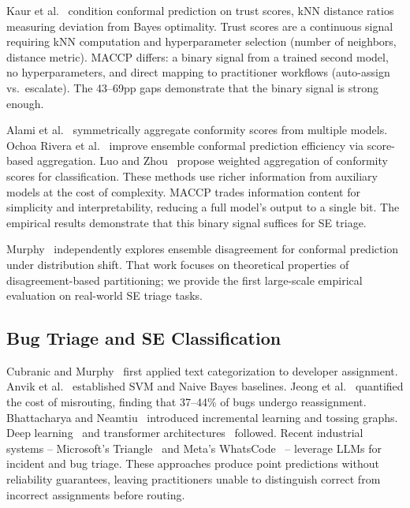 \documentclass[conference]{IEEEtran}
\newcommand{\pp}{\text{pp}}
\begin{document}
Kaur et al.~\cite{kaur2025trust} condition conformal prediction on trust scores, kNN distance ratios measuring deviation from Bayes optimality. Trust scores are a continuous signal requiring kNN computation and hyperparameter selection (number of neighbors, distance metric). MACCP differs: a binary signal from a trained second model, no hyperparameters, and direct mapping to practitioner workflows (auto-assign vs.\ escalate). The 43--69$\pp$ gaps demonstrate that the binary signal is strong enough.

Alami et al.~\cite{alami2025sacp} symmetrically aggregate conformity scores from multiple models. Ochoa Rivera et al.~\cite{ochoarivera2025csa} improve ensemble conformal prediction efficiency via score-based aggregation. Luo and Zhou~\cite{luo2025optimal} propose weighted aggregation of conformity scores for classification. These methods use richer information from auxiliary models at the cost of complexity. MACCP trades information content for simplicity and interpretability, reducing a full model's output to a single bit. The empirical results demonstrate that this binary signal suffices for SE triage.

Murphy~\cite{murphy2026calpoly} independently explores ensemble disagreement for conformal prediction under distribution shift. That work focuses on theoretical properties of disagreement-based partitioning; we provide the first large-scale empirical evaluation on real-world SE triage tasks.

\subsection{Bug Triage and SE Classification}

Cubranic and Murphy~\cite{cubranic2004automatic} first applied text categorization to developer assignment. Anvik et al.~\cite{anvik2006should} established SVM and Naive Bayes baselines. Jeong et al.~\cite{jeong2009improving} quantified the cost of misrouting, finding that 37--44\% of bugs undergo reassignment. Bhattacharya and Neamtiu~\cite{bhattacharya2010fine} introduced incremental learning and tossing graphs. Deep learning~\cite{xia2017elm} and transformer architectures~\cite{dipongkor2023transformer} followed. Recent industrial systems -- Microsoft's Triangle~\cite{chen2025triangle} and Meta's WhatsCode~\cite{xu2026whatscode} -- leverage LLMs for incident and bug triage. These approaches produce point predictions without reliability guarantees, leaving practitioners unable to distinguish correct from incorrect assignments before routing.
\end{document}
